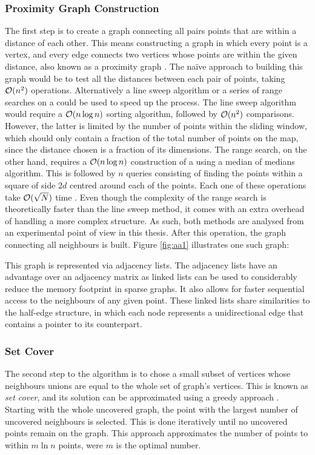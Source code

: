 \subsubsection*{Proximity Graph Construction}
The first step is to create a graph connecting all pairs points that are within a distance of each other. This means constructing a graph in which every point is a vertex, and every edge connects two vertices whose points are within the given distance, also known as a proximity graph \cite{proximity}. The naïve approach to building this graph would be to test all the distances between each pair of points, taking $\mathcal{O}(n^2)$ operations. Alternatively a line sweep algorithm or a series of range searches on a \kdtree could be used to speed up the process. The line sweep algorithm would require a $\mathcal{O}(n \log{n})$ sorting algorithm, followed by $\mathcal{O}(n^2)$ comparisons. However, the latter is limited by the number of points within the sliding window, which should only contain a fraction of the total number of points on the map, since the distance chosen is a fraction of its dimensions. The \kdtree range search, on the other hand, requires a $\mathcal{O}(n \log{n})$ construction of a \kdtree using a median of medians algorithm. This is followed by $n$ queries consisting of finding the points within a square of side $2d$ centred around each of the points. Each one of these operations take $\mathcal{O}(\sqrt{N})$ time \cite{kdrange}. Even though the complexity of the \kdtree range search is theoretically faster than the line sweep method, it comes with an extra overhead of handling a more complex structure. As such, both methods are analysed from an experimental point of view in this thesis. After this operation, the graph connecting all neighbours is built. Figure \ref{fig:aa1} illustrates one such graph:



This graph is represented via adjacency lists. The adjacency lists have an advantage over an adjacency matrix as linked lists can be used to considerably reduce the memory footprint in sparse graphs. It also allows for faster sequential access to the neighbours of any given point. These linked lists share similarities to the half-edge structure, in which each node represents a unidirectional edge that contains a pointer to its counterpart.

\subsubsection*{Set Cover}
The second step to the algorithm is to chose a small subset of vertices whose neighbours unions are equal to the whole set of graph's vertices. This is known as \emph{set cover}, and its solution can be approximated using a greedy approach \cite{greedyapprox}. Starting with the whole uncovered graph, the point with the largest number of uncovered neighbours is selected. This is done iteratively until no uncovered points remain on the graph. This approach approximates the number of points to within $m \ln{n}$ points, were $m$ is the optimal number.

